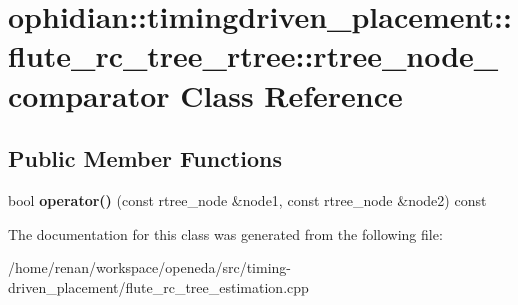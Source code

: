 \hypertarget{classophidian_1_1timingdriven__placement_1_1flute__rc__tree__rtree_1_1rtree__node__comparator}{\section{ophidian\-:\-:timingdriven\-\_\-placement\-:\-:flute\-\_\-rc\-\_\-tree\-\_\-rtree\-:\-:rtree\-\_\-node\-\_\-comparator Class Reference}
\label{classophidian_1_1timingdriven__placement_1_1flute__rc__tree__rtree_1_1rtree__node__comparator}
}
\subsection*{Public Member Functions}
\begin{DoxyCompactItemize}
\item 
\hypertarget{classophidian_1_1timingdriven__placement_1_1flute__rc__tree__rtree_1_1rtree__node__comparator_a1fb8b85507617390a63ae8be20a4c706}{bool {\bfseries operator()} (const rtree\-\_\-node \&node1, const rtree\-\_\-node \&node2) const }\label{classophidian_1_1timingdriven__placement_1_1flute__rc__tree__rtree_1_1rtree__node__comparator_a1fb8b85507617390a63ae8be20a4c706}

\end{DoxyCompactItemize}


The documentation for this class was generated from the following file\-:\begin{DoxyCompactItemize}
\item 
/home/renan/workspace/openeda/src/timing-\/driven\-\_\-placement/flute\-\_\-rc\-\_\-tree\-\_\-estimation.\-cpp\end{DoxyCompactItemize}
